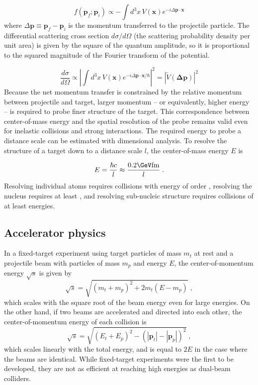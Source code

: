 \begin{equation}
  f\left(\mathbf{p}_f ; \mathbf{p}_i\right) \propto - \int d^3 x \, V(\mathbf{x}) e^{-i \Delta \mathbf{p} \cdot \mathbf{x}}
  \label{eqn:born}
\end{equation}
where $\Delta \mathbf{p} \equiv \mathbf{p}_f - \mathbf{p}_i$ is the momentum transferred to the projectile particle.
The differential scattering cross section $d\sigma/d\Omega$ (the scattering probability density per unit area) is given by the square of the quantum amplitude, so it is proportional to the squared magnitude of the Fourier transform of the potential.

\begin{equation}
  \frac{d\sigma}{d\Omega} \propto \left| \int d^3 x \, V(\mathbf{x}) e^{-i \Delta \mathbf{p} \cdot \mathbf{x} / \hbar} \right|^2 = \left| \tilde{V}(\mathbf{\Delta \mathbf{p}}) \right|^2
\end{equation}
Because the net momentum transfer is constrained by the relative momentum between projectile and target, larger momentum -- or equivalently, higher energy -- is required to probe finer structure of the target.
This correspondence between center-of-mass energy and the spatial resolution of the probe remains valid even for inelastic collisions and strong interactions.
The required energy to probe a distance scale can be estimated with dimensional analysis.
To resolve the structure of a target down to a distance scale $l$, the center-of-mass energy $E$ is

\begin{equation}
E = \frac{\hbar c}{l} \approx \frac{0.2 \GeV \fm}{l} \; .
\end{equation}
Resolving individual atoms requires collisions with energy of order \keV, resolving the nucleus requires at least \MeV, and resolving sub-nucleic structure requires collisions of at least \GeV energies.

\subsection{Accelerator physics}

In a fixed-target experiment using target particles of mass $m_t$ at rest and a projectile beam with particles of mass $m_p$ and energy $E$, the center-of-momentum energy $\sqrt{s}$ is given by
\begin{equation}
\sqrt{s} = \sqrt{(m_t+m_p)^2 + 2 m_t (E - m_p)} \; ,
\end{equation}
which scales with the square root of the beam energy even for large energies.
On the other hand, if two beams are accelerated and directed into each other, the center-of-momentum energy of each collision is
\begin{equation}
\sqrt{s} = \sqrt{(E_t + E_p)^2 - (|\mathbf{p}_t| - |\mathbf{p}_p|)^2} \; ,
\end{equation}
which scales linearly with the total energy, and is equal to $2E$ in the case where the beams are identical.
While fixed-target experiments were the first to be developed, they are not as efficient at reaching high energies as dual-beam colliders.

